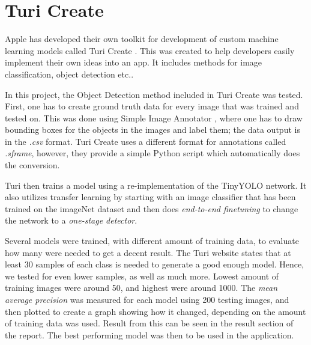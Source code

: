 \section{Turi Create}
Apple has developed their own toolkit for development of custom machine learning models called Turi Create \cite{turiCreate}. This was created to help developers easily implement their own ideas into an app. It includes methods for image classification, object detection etc.. 

In this project, the Object Detection method included in Turi Create was tested. First, one
 has to create ground truth data for every image that was trained and tested on. This was
 done using Simple Image Annotator \cite{simpleImage}, where one has to draw bounding
  boxes for the objects in the images and label them; the data output is in the \textit{.csv} format.  Turi Create uses a different format for annotations called \textit{.sframe},
  however, they provide a simple Python script which automatically does the conversion. 

Turi then trains a model using a re-implementation of the TinyYOLO network. It also utilizes transfer learning by starting with an image classifier that has been trained on the imageNet dataset and then does \textit{end-to-end finetuning} to change the network to a \textit{one-stage detector}.

Several models were trained, with different amount of training data, to evaluate how many
 were needed to get a decent result. The Turi website states that at least 30 samples of
each class is needed to generate a good enough model. Hence, we tested for even lower
samples, as well as much more. Lowest amount of training images were around 50, and
highest  were around 1000. The \textit{mean average precision} was measured for each model using 200 testing images, and then plotted to create a graph showing how it
 changed, depending on the amount of training data was used. Result from this can be
 seen in the result section of the report. The best performing model was then to be used in the application.

